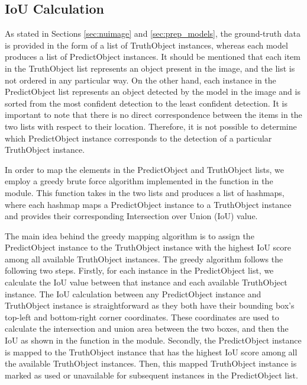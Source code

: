 \subsection{IoU Calculation}

As stated in Sections \ref{sec:nuimage} and \ref{sec:prep_models}, the ground-truth data is provided in the form of a list of TruthObject instances, whereas each model produces a list of PredictObject instances. It should be mentioned that each item in the TruthObject list represents an object present in the image, and the list is not ordered in any particular way. On the other hand, each instance in the PredictObject list represents an object detected by the model in the image and is sorted from the most confident detection to the least confident detection. It is important to note that there is no direct correspondence between the items in the two lists with respect to their location. Therefore, it is not possible to determine which PredictObject instance corresponds to the detection of a particular TruthObject instance.

In order to map the elements in the PredictObject and TruthObject lists, we employ a greedy brute force algorithm implemented in the  function in the  module. This function takes in the two lists and produces a list of hashmaps, where each hashmap maps a PredictObject instance to a TruthObject instance and provides their corresponding Intersection over Union (IoU) value.

The main idea behind the greedy mapping algorithm is to assign the PredictObject instance to the TruthObject instance with the highest IoU score among all available TruthObject instances. The greedy algorithm follows the following two steps. Firstly, for each instance in the PredictObject list, we calculate the IoU value between that instance and each available TruthObject instance. The IoU calculation between any PredictObject instance and TruthObject instance is straightforward as they both have their bounding box's top-left and bottom-right corner coordinates. These coordinates are used to calculate the intersection and union area between the two boxes, and then the IoU as shown in the  function in the  module. Secondly, the PredictObject instance is mapped to the TruthObject instance that has the highest IoU score among all the available TruthObject instances. Then, this mapped TruthObject instance is marked as used or unavailable for subsequent instances in the PredictObject list.

